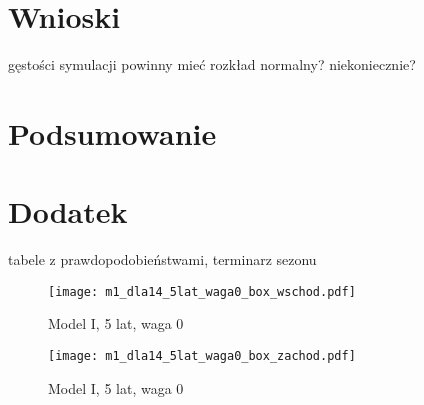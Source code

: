 \documentclass[inzynierska]{pwr_wmat_praca_dyplomowa}
\theoremstyle{plain}
\numberwithin{theorem}{chapter}
\theoremstyle{definition}
\numberwithin{theorem}{chapter}
\begin{document}
\chapter{Wnioski}
gęstości symulacji powinny mieć rozkład normalny? niekoniecznie?

{\backmatter \chapter{Podsumowanie}}

{\backmatter \chapter{Dodatek}}
tabele z prawdopodobieństwami, terminarz sezonu

\newpage

\begin{figure}[t]
	\texttt{[image: m1\_dla14\_5lat\_waga0\_box\_wschod.pdf]}
	\caption{Model I, 5 lat, waga 0}
	\centering
\end{figure}

\begin{figure}[t]
	\texttt{[image: m1\_dla14\_5lat\_waga0\_box\_zachod.pdf]}
	\caption{Model I, 5 lat, waga 0}
	\centering
\end{figure}
\end{document}
